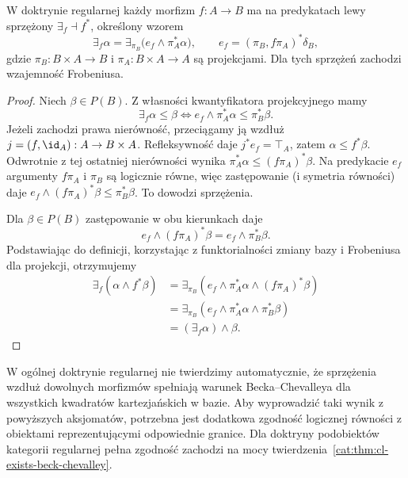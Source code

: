 \begin{twierdzenie}\label{cat:thm:cl-doctrine-exists}
W doktrynie regularnej każdy morfizm $f:A\to B$ ma na predykatach lewy sprzężony $\exists_f\dashv f^*$, określony wzorem
\[
 \exists_f\alpha
 =\exists_{\pi_B}\bigl(e_f\wedge\pi_A^*\alpha\bigr),
 \qquad
 e_f=(\pi_B,f\pi_A)^*\delta_B,
\]
gdzie $\pi_B:B\times A\to B$ i $\pi_A:B\times A\to A$ są projekcjami. Dla tych sprzężeń zachodzi wzajemność Frobeniusa.
\end{twierdzenie}
\begin{proof}
Niech $\beta\in P(B)$. Z własności kwantyfikatora projekcyjnego mamy
\[
 \exists_f\alpha\leq\beta
 \iff e_f\wedge\pi_A^*\alpha\leq\pi_B^*\beta.
\]
Jeżeli zachodzi prawa nierówność, przeciągamy ją wzdłuż $j=(f,\id_A):A\to B\times A$. Refleksywność daje $j^*e_f=\top_A$, zatem $\alpha\leq f^*\beta$. Odwrotnie z tej ostatniej nierówności wynika $\pi_A^*\alpha\leq(f\pi_A)^*\beta$. Na predykacie $e_f$ argumenty $f\pi_A$ i $\pi_B$ są logicznie równe, więc zastępowanie (i symetria równości) daje $e_f\wedge(f\pi_A)^*\beta\leq\pi_B^*\beta$. To dowodzi sprzężenia.

Dla $\beta\in P(B)$ zastępowanie w obu kierunkach daje
\[
 e_f\wedge(f\pi_A)^*\beta=e_f\wedge\pi_B^*\beta.
\]
Podstawiając do definicji, korzystając z funktorialności zmiany bazy i Frobeniusa dla projekcji, otrzymujemy
\[
\begin{aligned}
 \exists_f(\alpha\wedge f^*\beta)
 &=\exists_{\pi_B}(e_f\wedge\pi_A^*\alpha\wedge(f\pi_A)^*\beta)\\
 &=\exists_{\pi_B}(e_f\wedge\pi_A^*\alpha\wedge\pi_B^*\beta)\\
 &=(\exists_f\alpha)\wedge\beta.
\end{aligned}
\]
\end{proof}

W ogólnej doktrynie regularnej nie twierdzimy automatycznie, że sprzężenia wzdłuż dowolnych morfizmów spełniają warunek Becka--Chevalleya dla wszystkich kwadratów kartezjańskich w bazie. Aby wyprowadzić taki wynik z powyższych aksjomatów, potrzebna jest dodatkowa zgodność logicznej równości z obiektami reprezentującymi odpowiednie granice. Dla doktryny podobiektów kategorii regularnej pełna zgodność zachodzi na mocy twierdzenia~\ref{cat:thm:cl-exists-beck-chevalley}.

